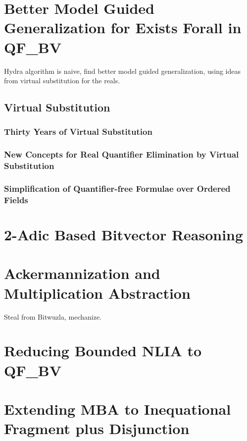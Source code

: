 \documentclass[withindex,glossary]{cam-thesis}
\begin{document}
\chapter{Better Model Guided Generalization for Exists Forall in QF\_BV}

Hydra algorithm is naive, find better model guided generalization,
using ideas from virtual substitution for the reals.

\section{Virtual Substitution}
\subsection{Thirty Years of Virtual Substitution}
\subsection{New Concepts for Real Quantifier Elimination by Virtual Substitution}
\subsection{Simplification of Quantifier-free Formulae over Ordered Fields}

\chapter{2-Adic Based Bitvector Reasoning}



\chapter{Ackermannization and Multiplication Abstraction}
Steal from Bitwuzla, mechanize.

\chapter{Reducing Bounded NLIA to QF\_BV}

\chapter{Extending MBA to Inequational Fragment plus Disjunction}
\end{document}
